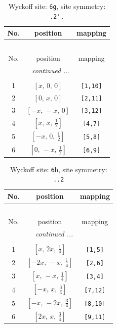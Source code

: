 \documentclass[fleqn,8pt]{jsarticle}
\begin{document}
\renewcommand{\arraystretch}{1.2}
\begin{longtable}{ccc}
\caption{Wyckoff site: {\tt 6g}, site symmetry: {\tt .2'.}}
 \\
 \hline \hline
No. & position & mapping \\ \hline \endfirsthead

\multicolumn{2}{l}{\tablename\ \thetable{}} \\
 \hline \hline
No. & position & mapping \\ \hline \endhead

 \hline \hline
\multicolumn{2}{r}{\footnotesize\it continued ...} \\ \endfoot

 \hline \hline
\multicolumn{2}{r}{} \\ \endlastfoot

1 & $\left[ x,\, 0,\, 0 \right]$ & {\tt [1,10]} \\ \hline
2 & $\left[ 0,\, x,\, 0 \right]$ & {\tt [2,11]} \\ \hline
3 & $\left[ - x,\, - x,\, 0 \right]$ & {\tt [3,12]} \\ \hline
4 & $\left[ x,\, x,\, \frac{1}{2} \right]$ & {\tt [4,7]} \\ \hline
5 & $\left[ - x,\, 0,\, \frac{1}{2} \right]$ & {\tt [5,8]} \\ \hline
6 & $\left[ 0,\, - x,\, \frac{1}{2} \right]$ & {\tt [6,9]} \\
\end{longtable}
\renewcommand{\arraystretch}{1.2}
\begin{longtable}{ccc}
\caption{Wyckoff site: {\tt 6h}, site symmetry: {\tt ..2}}
 \\
 \hline \hline
No. & position & mapping \\ \hline \endfirsthead

\multicolumn{2}{l}{\tablename\ \thetable{}} \\
 \hline \hline
No. & position & mapping \\ \hline \endhead

 \hline \hline
\multicolumn{2}{r}{\footnotesize\it continued ...} \\ \endfoot

 \hline \hline
\multicolumn{2}{r}{} \\ \endlastfoot

1 & $\left[ x,\, 2 x,\, \frac{1}{4} \right]$ & {\tt [1,5]} \\ \hline
2 & $\left[ - 2 x,\, - x,\, \frac{1}{4} \right]$ & {\tt [2,6]} \\ \hline
3 & $\left[ x,\, - x,\, \frac{1}{4} \right]$ & {\tt [3,4]} \\ \hline
4 & $\left[ - x,\, x,\, \frac{3}{4} \right]$ & {\tt [7,12]} \\ \hline
5 & $\left[ - x,\, - 2 x,\, \frac{3}{4} \right]$ & {\tt [8,10]} \\ \hline
6 & $\left[ 2 x,\, x,\, \frac{3}{4} \right]$ & {\tt [9,11]} \\
\end{longtable}
\end{document}
